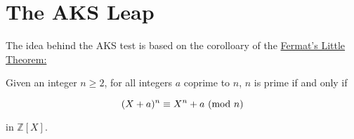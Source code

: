 \documentclass[../main.tex]{subfiles}
\begin{document}
\section{The AKS Leap}

The idea behind the AKS test is based on the corolloary of the \hyperref[theorem: flt]{Fermat's Little Theorem:}

\begin{theorem} \label{theorem: 1}
Given an integer $n \geq 2$, for all integers $a$ coprime to $n$, $n$ is prime if and only if

\begin{equation}
    (X + a)^{n} \equiv X^{n} + a \ (\mathrm{mod}\ n)
\end{equation}

in $\mathbb{Z}[X]$.

\end{theorem}
\end{document}

